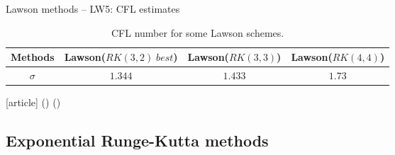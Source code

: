 \documentclass{beamer}
\newcommand{\customcite}[1]{\citeauthor{#1} (\citeyear{#1})}
\begin{document}
\begin{frame}{Lawson methods -- LW5: CFL estimates}
  \begin{table}
    \centering
    \begin{tabular}{|c|c|c|c|}
      \hline
      Methods & Lawson($RK(3,2) \; best$) & Lawson($RK(3,3)$) & Lawson($RK(4,4)$) \\
      \hline
      $\sigma $ & $1.344$ & $1.433$   & $1.73$   \\
      \hline  
    \end{tabular}
    \caption{CFL number for some Lawson schemes.}
  \end{table}
\begin{thebibliography}{9}
  [article]
  \bibitem{} \customcite{Motamed:2010}
  \bibitem{} \customcite{Lunet:2017}
\end{thebibliography}
\end{frame}

\subsection{Exponential Runge-Kutta methods}
\end{document}
